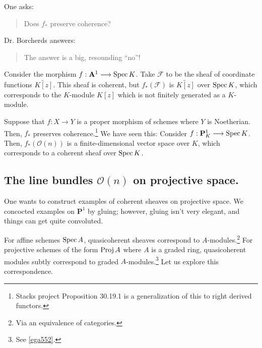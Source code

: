 \documentclass [11 pt, oneside] {article}
\begin{document}
One asks:
\begin{quote}
	\small Does $f_*$ preserve coherence?
\end{quote}
Dr. Borcherds answers:
\begin{quote}
	\small The answer is a big, resounding ``no''!
\end{quote}
Consider the morphism $f:\mathbf{A}^1\longrightarrow \operatorname{Spec} K$. Take $\mathscr{F} $ to be the sheaf of coordinate functions $\widetilde{K[z]}$. This sheaf is coherent, but $f_*(\mathscr{F})$ is $\widetilde{K[z]}$ over $\operatorname{Spec} K$, which corresponds to the $K$-module $K[z]$ which is not finitely generated as a $K$-module. 

Suppose that $f:X\longrightarrow Y$ is a proper morphism of schemes where $Y$ is Noetherian. Then, $f_*$ preserves coherence.\footnote{Stacks project Proposition 30.19.1 is a generalization of this to right derived functors.} We have seen this: Consider $f:\mathbf{P}^1_K\longrightarrow \operatorname{Spec} K$. Then, $f_*(\mathscr{O}(n))$ is a finite-dimensional vector space over $K$, which corresponds to a coherent sheaf over $\operatorname{Spec} K$.

\subsection{The line bundles \texorpdfstring{$\mathscr O(n)$}{O(n)} on projective space.}

One wants to construct examples of coherent sheaves on projective space. We concocted examples on $\mathbf{P}^1$ by gluing; however, gluing isn't very elegant, and things can get quite convoluted. 

For affine schemes $\operatorname{Spec} A$, quasicoherent sheaves correspond to $A$-modules.\footnote{Via an equivalence of categories.}
For projective schemes of the form $\operatorname{Proj} A$ where $A$ is a graded ring, quasicoherent modules subtly correspond to graded $A$-modules.\footnote{See \cref{ega552}.} Let us explore this correspondence.
\end{document}
